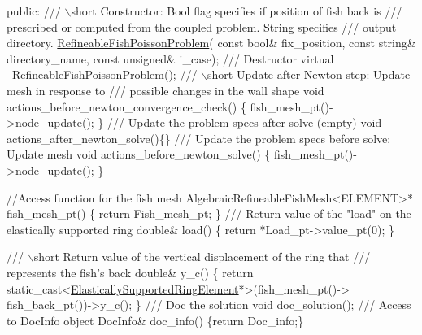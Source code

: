 \begin{DoxyCodeInclude}
\textcolor{keyword}{public}:
\textcolor{comment}{}
\textcolor{comment}{ /// \(\backslash\)short  Constructor: Bool flag specifies if position of fish back is}
\textcolor{comment}{ /// prescribed or computed from the coupled problem. String specifies}
\textcolor{comment}{ /// output directory.}
\textcolor{comment}{} \hyperlink{classRefineableFishPoissonProblem}{RefineableFishPoissonProblem}(
  \textcolor{keyword}{const} \textcolor{keywordtype}{bool}& fix\_position, \textcolor{keyword}{const} \textcolor{keywordtype}{string}& directory\_name,
  \textcolor{keyword}{const} \textcolor{keywordtype}{unsigned}& i\_case);
  \textcolor{comment}{}
\textcolor{comment}{ /// Destructor}
\textcolor{comment}{} \textcolor{keyword}{virtual} ~\hyperlink{classRefineableFishPoissonProblem}{RefineableFishPoissonProblem}();
\textcolor{comment}{}
\textcolor{comment}{ /// \(\backslash\)short Update after Newton step: Update mesh in response to }
\textcolor{comment}{ /// possible changes in the wall shape}
\textcolor{comment}{} \textcolor{keywordtype}{void} actions\_before\_newton\_convergence\_check()
  \{
   fish\_mesh\_pt()->node\_update();
  \}
\textcolor{comment}{}
\textcolor{comment}{ /// Update the problem specs after solve (empty)}
\textcolor{comment}{} \textcolor{keywordtype}{void} actions\_after\_newton\_solve()\{\}
  \textcolor{comment}{}
\textcolor{comment}{ /// Update the problem specs before solve: Update mesh}
\textcolor{comment}{} \textcolor{keywordtype}{void} actions\_before\_newton\_solve() 
  \{
   fish\_mesh\_pt()->node\_update();
  \}

 \textcolor{comment}{//Access function for the fish mesh}
 AlgebraicRefineableFishMesh<ELEMENT>* fish\_mesh\_pt() 
  \{
   \textcolor{keywordflow}{return} Fish\_mesh\_pt;
  \}
\textcolor{comment}{}
\textcolor{comment}{ /// Return value of the "load" on the elastically supported ring}
\textcolor{comment}{} \textcolor{keywordtype}{double}& load()
  \{
   \textcolor{keywordflow}{return} *Load\_pt->value\_pt(0);
  \}

\textcolor{comment}{}
\textcolor{comment}{ /// \(\backslash\)short Return value of the vertical displacement of the ring that}
\textcolor{comment}{ /// represents the fish's back}
\textcolor{comment}{} \textcolor{keywordtype}{double}& y\_c()
  \{
   \textcolor{keywordflow}{return} \textcolor{keyword}{static\_cast<}\hyperlink{classoomph_1_1ElasticallySupportedRingElement}{ElasticallySupportedRingElement}*\textcolor{keyword}{>}(fish\_mesh\_pt()->
                                                        fish\_back\_pt())->y\_c();
  \}
\textcolor{comment}{}
\textcolor{comment}{ /// Doc the solution}
\textcolor{comment}{} \textcolor{keywordtype}{void} doc\_solution();
\textcolor{comment}{}
\textcolor{comment}{ /// Access to DocInfo object}
\textcolor{comment}{} DocInfo& doc\_info() \{\textcolor{keywordflow}{return} Doc\_info;\}


\end{DoxyCodeInclude}
